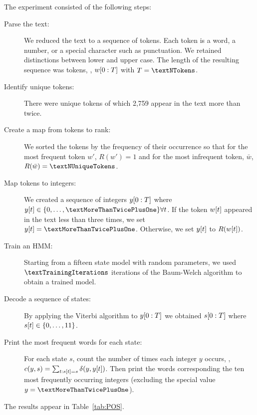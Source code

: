 The experiment consisted of the following steps:
\begin{description}
\item[Parse the text:] We reduced the text to a sequence of tokens.
  Each token is a word, a number, or a special character such as
  punctuation.  We retained distinctions between lower and upper case.
  The length of the resulting sequence was \textNTokens tokens, \ie,
  $w[0:T]$ with $T=\textNTokens$.
\item[Identify unique tokens:] There were \textNUniqueTokens unique tokens of which
  2,759 appear in the text more than twice.
\item[Create a map from tokens to rank:] We sorted the tokens by the
  frequency of their occurrence so that for the most frequent token
  $w'$, $R(w')=1$ and for the most infrequent token, $\bar w$, $R(\bar
  w)=\textNUniqueTokens$.
\item[Map tokens to integers:] We created a sequence of integers
  $y[0:T]$ where $\ti{y}{t} \in \{0,\ldots,\textMoreThanTwicePlusOne\} \forall
  t$.  If the token ${w}{[t]}$ appeared in the text less than three
  times, we set $\ti{y}{t}=\textMoreThanTwicePlusOne$.  Otherwise, we set  ${y}{[t]}$ to
  $R({w}{[t]})$.
\item[Train an HMM:] Starting from a fifteen state model with random
  parameters, we used $\textTrainingIterations$ iterations of the
  Baum-Welch algorithm to obtain a trained model.
\item[Decode a sequence of states:] By applying the Viterbi algorithm
  to $y[0:T]$ we obtained $s[0:T]$ where ${s}{[t]}\in
  \{0,\ldots,11\}$.
\item[Print the most frequent words for each state:] For each state
  $s$, count the number of times each integer $y$ occurs, \ie, $c(y,s)
  = \sum_{t:{s}{[t]}=s} \delta(y,{y}{[t]})$.  Then print the words
  corresponding the ten most frequently occurring integers (excluding
  the special value $y=\textMoreThanTwicePlusOne$).
\end{description}
The results appear in Table~\ref{tab:POS}.

